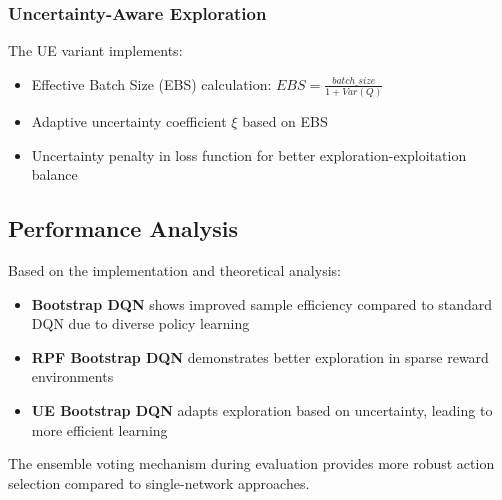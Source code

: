 \documentclass[12pt]{article}
\begin{document}
{{{\subsubsection{Uncertainty-Aware Exploration}
The UE variant implements:
\begin{itemize}
    \item Effective Batch Size (EBS) calculation: $EBS = \frac{batch\_size}{1 + Var(Q)}$
    \item Adaptive uncertainty coefficient $\xi$ based on EBS
    \item Uncertainty penalty in loss function for better exploration-exploitation balance
\end{itemize}

\subsection{Performance Analysis}

Based on the implementation and theoretical analysis:

\begin{itemize}
    \item \textbf{Bootstrap DQN} shows improved sample efficiency compared to standard DQN due to diverse policy learning
    \item \textbf{RPF Bootstrap DQN} demonstrates better exploration in sparse reward environments
    \item \textbf{UE Bootstrap DQN} adapts exploration based on uncertainty, leading to more efficient learning
\end{itemize}

The ensemble voting mechanism during evaluation provides more robust action selection compared to single-network approaches.

}}}
\end{document}
